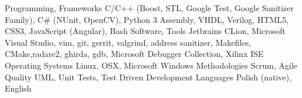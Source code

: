 

\begin{cvskills}

  \cvskill
    {Programming, Frameworks} %
    {C/C++ (Boost, STL, Google Test, Google Sanitizer Family), C\# (NUnit, OpenCV), Python 3 \newline
    Assembly, VHDL, Verilog, HTML5, CSS3, JavaScript (Angular), Bash} %
    \newline
  \cvskill
    {Software, Tools} %
    {Jetbrains CLion, Microsoft Visual Studio, vim, git, gerrit, valgrind, address sanitizer, Makefiles, CMake,\newline radare2, ghirda, gdb, Microsoft Debugger Collection, Xilinx ISE} %
    \newline
  \cvskill
    {Operating Systems}
    {Linux, OSX, Microsoft Windows}
  \cvskill
    {Methodologies}
    {Scrum, Agile}
  \cvskill
     {Quality}
     {UML, Unit Tests, Test Driven Development}
  \cvskill
    {Languages} %
    {Polish (native), English} %

\end{cvskills}
